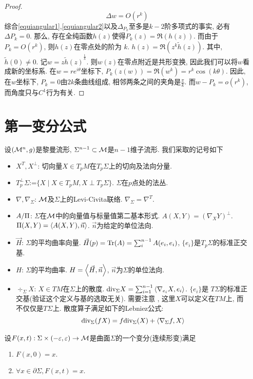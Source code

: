 \begin{proof}
    \begin{equation} \label{equiangular2}
        \Delta w= O(r^{k})
    \end{equation}
    综合\eqref{equiangular1},\eqref{equiangular2}以及$\Delta_{P_k}$至多是$k-2$阶多项式的事实, 必有 $\Delta P_k=0$.  那么, 存在全纯函数$h(z)$使得$P_k(z)=\Re(h(z))$. 而由于$P_k=O(r^k)$, 则$h(z)$在零点处的阶为 $k$. $h(z)=\Re(z^k\tilde{h}(z))$. 其中, $\tilde{h}(0) \ne 0$.  记$w=z{\tilde{h}(z)}^\frac{1}{k}$. 则$w(z)$在零点附近是共形变换, 因此我们可以将$w$看成新的坐标系.  在$w=re^{i\theta}$坐标下, $P_k(z(w))=\Re(w^k)=r^k\cos(k\theta)$. 因此, 在$w$坐标下, $P_k=0$由$2k$条曲线组成, 相邻两条之间的夹角是$\frac{\pi}{k}$. 而$w-P_k=o(r^k)$,  而角度只与$C^1$行为有关.
\end{proof}

\section{第一变分公式} \label{sec_first_variation}
设$({\mathcal{M}}^n,g)$是黎曼流形, $\Sigma^{n-1}\subset {\mathcal{M}}$是$n-1$维子流形. 我们采取的记号如下
\begin{itemize}
    \item $X^T,X^\perp$: 切向量$X \in T_pM$在$T_p\Sigma$上的切向及法向分量.
    \item $T_p^\perp \Sigma$:=$\{X\mid X\in T_pM, X\perp T_p\Sigma\}$. $\Sigma$在$p$点处的法丛.
    \item $\nabla,\nabla_\Sigma$: ${\mathcal{M}}$及$\Sigma$上的Levi-Civita联络. $\nabla_\Sigma=\nabla^{T}$.
    \item $A/{\Pi}$: $\Sigma$在${\mathcal{M}}$中的向量值与标量值第二基本形式. $A(X,Y)=(\nabla_XY)^\perp$. ${\Pi}(X,Y)={\left < A(X,Y), \vec{n} \right >}$. $\vec{n}$为给定的单位法向.
    \item $\vec{H}$: $\Sigma$的平均曲率向量. $\vec{H}(p)={\text{Tr}}(A)=\sum_{i}^{n-1}A(e_i,e_i)$, $\{e_i\}$是$T_p\Sigma$的标准正交基.
    \item ${H}$: $\Sigma$的平均曲率. $H={\left < \vec{H}, \vec{n} \right >}$, $\vec{n}$为$\Sigma$的单位法向.
    \item $\div_\Sigma X$: $X \in TM$在$\Sigma$上的散度. ${\text{div}}_\Sigma X=\sum_{i=1}^{n-1}{\left < \nabla_{e_i}X, e_i \right >}$. $\{e_i\}$是 $T\Sigma$的标准正交基(验证这个定义与基的选取无关). 需要注意 , 这里$X$可以定义在$TM$上, 而不仅仅是$T\Sigma$上. 散度算子满足如下的Lebniez公式:
    \begin{equation}
        {\text{div}}_\Sigma(fX)=f{\text{div}}_\Sigma(X)+{\left < \nabla_\Sigma f, X \right >}
    \end{equation}
\end{itemize}
设$F(x,t): \Sigma \times (-\varepsilon, \varepsilon) \to {\mathcal{M}}$是曲面$\Sigma$的一个变分(连续形变)满足
\begin{enumerate}
    \item $F(x,0)=x$.
    \item $\forall x \in \partial \Sigma, F(x,t)=x$.
\end{enumerate}

